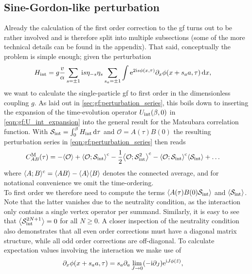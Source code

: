 \subsection{Sine-Gordon-like perturbation}\label{sec:ell:gf:sine_Gordon_perturbation}
Already the calculation of the first order correction to the \gls{gf} turns out to be rather involved and is therefore split into multiple subsections (some of the more technical details can be found in the appendix).
That said, conceptually the problem is simple enough; given the perturbation
\begin{align}
H_\tint &= g \frac{v}{\alpha} \sum_{s=\pm 1} \i s\eta_{-s} \eta_s \sum_{s_a = \pm 1} \int \powe{2\i s\phi(x,\tau)} \partial_x \phi(x + s_aa, \tau)\,\d x,
\end{align}
we want to calculate the single-particle \gls{gf} to first order in the dimensionless coupling $g$.
As laid out in \autoref{sec:gf:perturbation_series}, this boils down to inserting the expansion of the time-evolution operator $U_\tint(\beta, 0)$ in \autoref{eqn:gf:U_int_expansion}
into the general result for the Matsubara correlation function. 
With $\sact_\tint = \intx{0}{\beta}{H_\tint}{\tau}$ and $\mathcal{O} = A(\tau)B(0)$ the resulting perturbation series in \autoref{eqn:gf:perturbation_series} then reads
\begin{align*}
C^\M_{AB}(\tau) &= -\bra*{\mathcal{O}} + \bra*{\mathcal{O}; \sact_\tint}^\c - \frac{1}{2} \bra*{\mathcal{O}; \sact_\tint^2}^\c - \bra*{\mathcal{O}; \sact_\tint}^\c \bra*{\sact_\tint} + \dots
\end{align*}
where $\bra{A;B}^\c = \bra{AB} - \bra{A}\bra{B}$ denotes the connected average, and for notational convenience we omit the time-ordering.\\
To first order we therefore need to compute the terms $\bra{A(\tau)B(0) \sact_\tint}$ and $\bra{\sact_\tint}$.
Note that the latter vanishes due to the neutrality condition, as the interaction only contains a single vertex operator per summand.
Similarly, it is easy to see that $\bra[\big]{\sact_\tint^{2N+1}} = 0$ for all $N\ge 0$.
A closer inspection of the neutrality condition also demonstrates that all even order corrections must have a diagonal matrix structure, while all odd order corrections are off-diagonal.
To calculate expectation values involving the interaction we make use of
\begin{align*}
\partial_x\phi(x+s_aa,\tau) &= s_a\partial_a \lim_{J\rightarrow 0} (-\i\partial_J) \powe{\i J\phi(\tilde{z})},
\end{align*}
